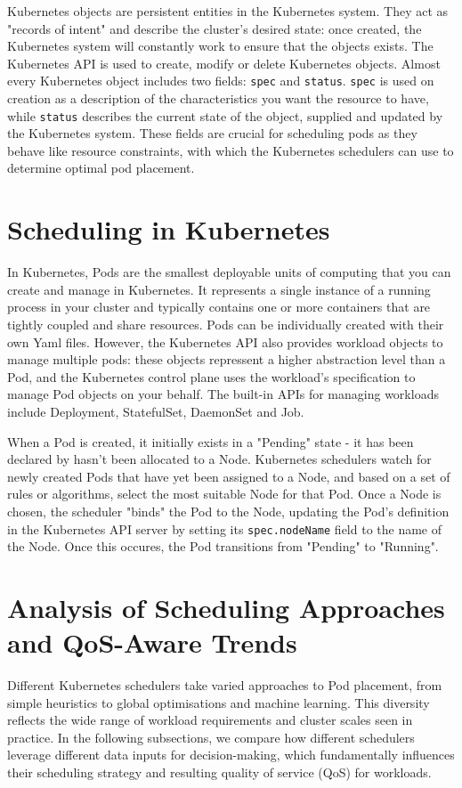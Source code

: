 Kubernetes objects are persistent entities in the Kubernetes system. They act as
"records of intent" and describe the cluster's desired state: once created, the
Kubernetes system will constantly work to ensure that the objects exists. The
Kubernetes API is used to create, modify or delete Kubernetes objects. Almost
every Kubernetes object includes two fields: \verb|spec| and \verb|status|.
\verb|spec| is used on creation as a description of the characteristics you want
the resource to have, while \verb|status| describes the current state of the
object, supplied and updated by the Kubernetes system. These fields are crucial
for scheduling pods as they behave like resource constraints, with which the
Kubernetes schedulers can use to determine optimal pod placement.

\section{Scheduling in Kubernetes}
In Kubernetes, Pods are the smallest deployable units of computing that you can
create and manage in Kubernetes. It represents a single instance of a running
process in your cluster and typically contains one or more containers that are
tightly coupled and share resources. Pods can be individually created with their
own Yaml files. However, the Kubernetes API also provides workload objects to manage
multiple pods: these objects repressent a higher abstraction level than a Pod,
and the Kubernetes control plane uses the workload's specification to manage Pod
objects on your behalf. The built-in APIs for managing workloads include
Deployment, StatefulSet, DaemonSet and Job.

When a Pod is created, it initially exists in a "Pending" state - it has been
declared by hasn't been allocated to a Node. Kubernetes schedulers watch for
newly created Pods that have yet been assigned to a Node, and based on a set of
rules or algorithms, select the most suitable Node for that Pod. Once a Node is
chosen, the scheduler "binds" the Pod to the Node, updating the Pod's definition
in the Kubernetes API server by setting its \verb|spec.nodeName| field to the
name of the Node. Once this occures, the Pod transitions from "Pending" to
"Running".

\section{Analysis of Scheduling Approaches and QoS-Aware Trends}
Different Kubernetes schedulers take varied approaches to Pod placement, from
simple heuristics to global optimisations and machine learning. This diversity
reflects the wide range of workload requirements and cluster scales seen in
practice. In the following subsections, we compare how different schedulers
leverage different data inputs for decision-making, which fundamentally
influences their scheduling strategy and resulting quality of service (QoS) for
workloads.

